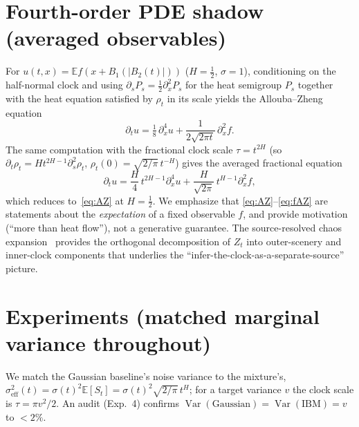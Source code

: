 \documentclass[11pt]{article}
\theoremstyle{definition}
\newcommand{\E}{\mathbb{E}}
\DeclareMathOperator{\Var}{Var}
\begin{document}
\section{Fourth-order PDE shadow (averaged observables)}
For $u(t,x)=\E f(x+B_1(|B_2(t)|))$ ($H=\tfrac12$, $\sigma=1$), conditioning on
the half-normal clock and using $\partial_s P_s=\tfrac12\partial_x^2 P_s$ for the
heat semigroup $P_s$ together with the heat equation satisfied by $\rho_t$ in its
scale yields the Allouba--Zheng equation~\cite{AllouZheng2001,FontesIBMIto}
\begin{equation}\label{eq:AZ}
  \partial_t u=\tfrac18\,\partial_x^4 u+\frac{1}{2\sqrt{2\pi t}}\,\partial_x^2 f.
\end{equation}
The same computation with the fractional clock scale $\tau=t^{2H}$
(so $\partial_t\rho_t=H t^{2H-1}\partial_s^2\rho_t$, $\rho_t(0)=\sqrt{2/\pi}\,t^{-H}$)
gives the averaged fractional equation
\begin{equation}\label{eq:fAZ}
  \partial_t u=\frac{H}{4}\,t^{2H-1}\partial_x^4 u+\frac{H}{\sqrt{2\pi}}\,t^{H-1}\partial_x^2 f,
\end{equation}
which reduces to~\eqref{eq:AZ} at $H=\tfrac12$. We emphasize that
\eqref{eq:AZ}--\eqref{eq:fAZ} are statements about the \emph{expectation} of a
fixed observable $f$, and provide motivation (``more than heat flow''), not a
generative guarantee. The source-resolved chaos
expansion~\cite{FontesChaos} provides the orthogonal decomposition of $Z_t$ into
outer-scenery and inner-clock components that underlies the
``infer-the-clock-as-a-separate-source'' picture.

\section{Experiments (matched marginal variance throughout)}
We match the Gaussian baseline's noise variance to the mixture's,
$\sigma_{\mathrm{eff}}^2(t)=\sigma(t)^2\E[S_t]=\sigma(t)^2\sqrt{2/\pi}\,t^{H}$;
for a target variance $v$ the clock scale is $\tau=\pi v^2/2$. An audit
(Exp.~4) confirms $\Var(\text{Gaussian})=\Var(\text{IBM})=v$ to $<2\%$.
\end{document}

